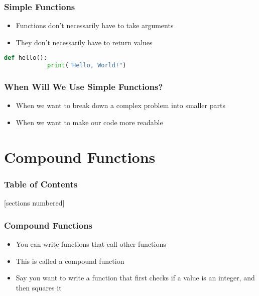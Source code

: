 \documentclass[serif, 9pt, aspectratio=32]{beamer}
\begin{document}
\begin{frame}
    \centering
    \frametitle{Simple Functions}
    \begin{itemize}
        \setlength{\itemsep}{3em}
        \item Functions don't necessarily have to take arguments
        \item They don't necessarily have to return values
    \end{itemize}
\end{frame}

\begin{frame}[fragile]
    \begin{lstlisting}[language=Python]
        def hello():
            print("Hello, World!")
    \end{lstlisting}
\end{frame}

\begin{frame}
    \centering
    \frametitle{When Will We Use Simple Functions?}
    \begin{itemize}
        \setlength{\itemsep}{3em}
        \item When we want to break down a complex problem into smaller parts
        \item When we want to make our code more readable
    \end{itemize}
\end{frame}

\section{Compound Functions}

\begin{frame}
    \frametitle{Table of Contents}
    [sections numbered]
    \tableofcontents[currentsection]
\end{frame}

\begin{frame}
    \centering
    \frametitle{Compound Functions}
    \begin{itemize}
        \setlength{\itemsep}{3em}
        \item You can write functions that call other functions
        \item This is called a compound function
        \item Say you want to write a function that first checks if a value is an integer, and then squares it
    \end{itemize}
\end{frame}
\end{document}
